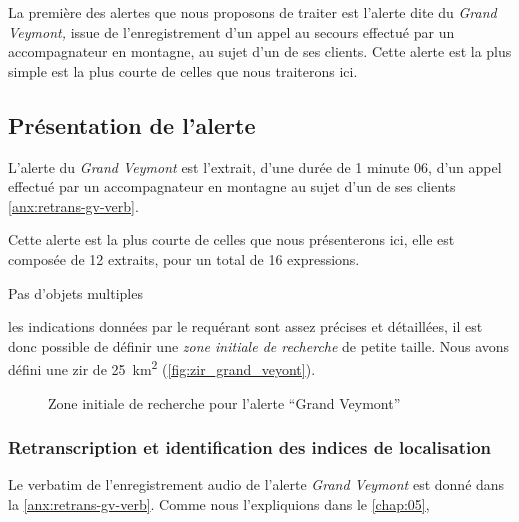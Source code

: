 La première des alertes que nous proposons de traiter est l'alerte
dite du \emph{Grand Veymont,} issue de l'enregistrement d'un appel au
secours effectué par un accompagnateur en montagne, au sujet d'un de
ses clients.
%
Cette alerte est la plus simple est la plus courte de celles que nous
traiterons ici.

\subsection{Présentation de l'alerte}
\label{subsec:9-2-1}

L'alerte du \emph{Grand Veymont} est l'extrait, d'une durée de 1
minute 06, d'un appel effectué par un accompagnateur en montagne au
sujet d'un de ses clients \autoref{anx:retrans-gv-verb}.


Cette alerte est la plus courte de celles que nous présenterons ici,
elle est composée de 12 extraits, pour un total de 16 expressions.



Pas d'objets multiples

les indications données par le requérant sont assez précises et
détaillées, il est donc possible de définir une \emph{zone initiale de
  recherche} de petite taille. Nous avons défini une \ac{zir} de
\SI{25}{\kilo\meter\squared} (\autoref{fig:zir_grand_veyont}).

\begin{figure}
  \centering
  
  \caption{Zone initiale de recherche pour l'alerte \enquote{Grand Veymont}}
  \label{fig:zir_grand_veyont}
\end{figure}


\subsubsection{Retranscription et identification des indices de localisation}
\label{subsec:9-2-1-1}


Le verbatim de l'enregistrement audio de l'alerte \emph{Grand Veymont}
est donné dans la \autoref{anx:retrans-gv-verb}.
%
Comme nous l’expliquions dans le \autoref{chap:05}, 


